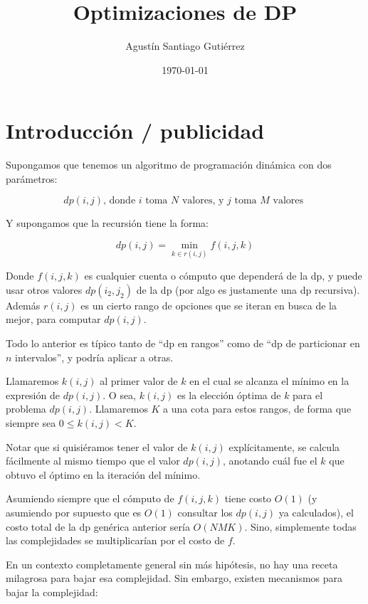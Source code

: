 \documentclass{article}
\title{Optimizaciones de DP}
\author{Agustín Santiago Gutiérrez}
\date{\today}
\begin{document}
\maketitle

\section{Introducción / publicidad}

Supongamos que tenemos un algoritmo de programación dinámica con dos parámetros:

$$dp(i,j) \mbox{, donde $i$ toma $N$ valores, y $j$ toma $M$ valores } $$

Y supongamos que la recursión tiene la forma:

$$dp(i,j) = \min_{k \in r(i,j)}{f(i,j,k)} $$

Donde $f(i,j,k)$ es cualquier cuenta o cómputo que dependerá de la dp, y puede usar otros valores $dp(i_2,j_2)$ de la dp (por algo es justamente una dp recursiva).
Además $r(i,j)$ es un cierto rango de opciones que se iteran en busca de la mejor, para computar $dp(i,j)$.

Todo lo anterior es típico tanto de ``dp en rangos'' como de ``dp de particionar en $n$ intervalos'', y podría aplicar a otras.

Llamaremos $k(i,j)$ al primer valor de $k$ en el cual se alcanza el mínimo en la expresión de $dp(i,j)$. O sea, $k(i,j)$ es la elección óptima de $k$ para el problema $dp(i,j)$.  Llamaremos $K$ a una cota para estos rangos, de forma que siempre sea $0 \leq k(i,j) < K$.

Notar que si quisiéramos tener el valor de $k(i,j)$ explícitamente, se calcula fácilmente al mismo tiempo que el valor $dp(i,j)$, anotando cuál fue el $k$ que obtuvo el óptimo en la iteración del mínimo.

Asumiendo siempre que el cómputo de $f(i,j,k)$ tiene costo $O(1)$ (y asumiendo por supuesto que es $O(1)$ consultar los $dp(i,j)$ ya calculados),
el costo total de la dp genérica anterior sería $O(NMK)$. Sino, simplemente todas las complejidades se multiplicarían por el costo de $f$.

En un contexto completamente general sin más hipótesis, no hay una receta milagrosa para bajar esa complejidad. Sin embargo, existen mecanismos para bajar
la complejidad:
\end{document}
